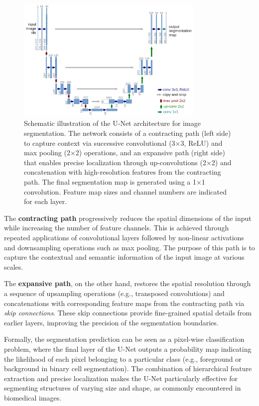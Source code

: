 \begin{figure}[!ht]
    \centering
    \includegraphics[width=0.8\textwidth]{Images/SOTA/u-net-architecture.png}
    \caption{Schematic illustration of the U-Net architecture for image segmentation. The network consists of a contracting path (left side) to capture context via successive convolutional (3×3, ReLU) and max pooling (2×2) operations, and an expansive path (right side) that enables precise localization through up-convolutions (2×2) and concatenation with high-resolution features from the contracting path. The final segmentation map is generated using a 1×1 convolution. Feature map sizes and channel numbers are indicated for each layer.}
    \label{fig:unet}
\end{figure}


The \textbf{contracting path} progressively reduces the spatial dimensions of the input while increasing the number of feature channels. This is achieved through repeated applications of convolutional layers followed by non-linear activations and downsampling operations such as max pooling. The purpose of this path is to capture the contextual and semantic information of the input image at various scales.

The \textbf{expansive path}, on the other hand, restores the spatial resolution through a sequence of upsampling operations (e.g., transposed convolutions) and concatenations with corresponding feature maps from the contracting path via \textit{skip connections}. These skip connections provide fine-grained spatial details from earlier layers, improving the precision of the segmentation boundaries.

Formally, the segmentation prediction can be seen as a pixel-wise classification problem, where the final layer of the U-Net outputs a probability map indicating the likelihood of each pixel belonging to a particular class (e.g., foreground or background in binary cell segmentation). The combination of hierarchical feature extraction and precise localization makes the U-Net particularly effective for segmenting structures of varying size and shape, as commonly encountered in biomedical images.

